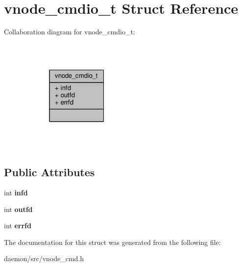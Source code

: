 \hypertarget{structvnode__cmdio__t}{\section{vnode\+\_\+cmdio\+\_\+t Struct Reference}
\label{structvnode__cmdio__t}
}


Collaboration diagram for vnode\+\_\+cmdio\+\_\+t\+:
\nopagebreak
\begin{figure}[H]
\begin{center}
\leavevmode
\includegraphics[width=163pt]{structvnode__cmdio__t__coll__graph}
\end{center}
\end{figure}
\subsection*{Public Attributes}
\begin{DoxyCompactItemize}
\item 
\hypertarget{structvnode__cmdio__t_a314a7a6b8af6f7d4863db65ef0dc152c}{int {\bfseries infd}}\label{structvnode__cmdio__t_a314a7a6b8af6f7d4863db65ef0dc152c}

\item 
\hypertarget{structvnode__cmdio__t_a050c7e0007157a9a1e49e38eca4f618f}{int {\bfseries outfd}}\label{structvnode__cmdio__t_a050c7e0007157a9a1e49e38eca4f618f}

\item 
\hypertarget{structvnode__cmdio__t_ab23cb508e67e9939eab0c9cc73d72213}{int {\bfseries errfd}}\label{structvnode__cmdio__t_ab23cb508e67e9939eab0c9cc73d72213}

\end{DoxyCompactItemize}


The documentation for this struct was generated from the following file\+:\begin{DoxyCompactItemize}
\item 
daemon/src/vnode\+\_\+cmd.\+h\end{DoxyCompactItemize}
